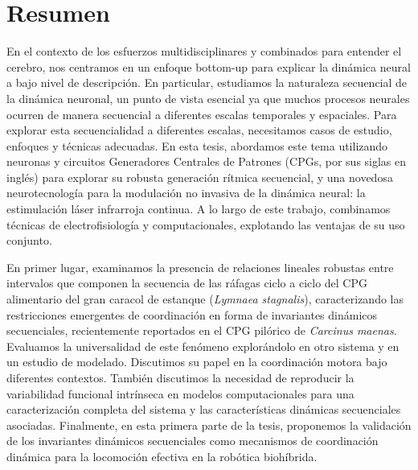 \chapter*{Resumen}
En el contexto de los esfuerzos multidisciplinares y combinados para entender el cerebro, nos centramos en un enfoque bottom-up para explicar la dinámica neural a bajo nivel de descripción. En particular, estudiamos la naturaleza secuencial de la dinámica neuronal, un punto de vista esencial ya que muchos procesos neurales ocurren de manera secuencial a diferentes escalas temporales y espaciales. Para explorar esta secuencialidad a diferentes escalas, necesitamos casos de estudio, enfoques y técnicas adecuadas. En esta tesis, abordamos este tema utilizando neuronas y circuitos Generadores Centrales de Patrones (CPGs, por sus siglas en inglés) para explorar su robusta generación rítmica secuencial, y una novedosa neurotecnología para la modulación no invasiva de la dinámica neural: la estimulación láser infrarroja continua. A lo largo de este trabajo, combinamos técnicas de electrofisiología y computacionales, explotando las ventajas de su uso conjunto.

En primer lugar, examinamos la presencia de relaciones lineales robustas entre intervalos que componen la secuencia de las ráfagas ciclo a ciclo del CPG alimentario del gran caracol de estanque (\textit{Lymnaea stagnalis}), caracterizando las restricciones emergentes de coordinación en forma de invariantes dinámicos secuenciales, recientemente reportados en el CPG pilórico de \textit{Carcinus maenas}. Evaluamos la universalidad de este fenómeno explorándolo en otro sistema y en un estudio de modelado. Discutimos su papel en la coordinación motora bajo diferentes contextos. También discutimos la necesidad de reproducir la variabilidad funcional intrínseca en modelos computacionales para una caracterización completa del sistema y las características dinámicas secuenciales asociadas. Finalmente, en esta primera parte de la tesis, proponemos la validación de los invariantes dinámicos secuenciales como mecanismos de coordinación dinámica para la locomoción efectiva en la robótica biohíbrida.

